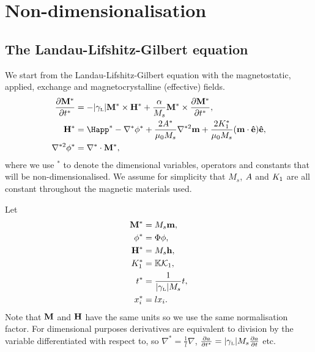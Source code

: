 \section{Non-dimensionalisation}
\label{sec:normalisations-appendix}



\subsection{The Landau-Lifshitz-Gilbert equation}
\label{sec:land-lifsh-gilb-normalisation}

We start from the Landau-Lifshitz-Gilbert equation with the magnetostatic, applied, exchange and magnetocrystalline (effective) fields. 
\begin{align}
  \pd{\Mv^*}{t^*} &= - \gymagc \Mv^* \times \Hv^* + \frac{\alpha}{M_s} \Mv^* \times \pd{\Mv^*}{t^*}, \label{eqn:llgnd} \\
  \Hv^* &= \Happ^* - \nabla^* \phi^* + \frac{2\Exchc^*}{\mu_0 M_s} \nabla^{*2} \mv + \frac{2\Kone^*}{\mu_0 M_s} (\mv \cdot \ev) \ev,
          \label{eqn:effnd} \\
  \nabla^{*2} \phi^* &= \nabla^* \cdot \Mv^*, \label{eqn:phind}
\end{align}
where we use $^*$ to denote the dimensional variables, operators and constants that will be non-dimensionalised. We assume for simplicity that $M_s$, $A$ and $K_1$ are all
constant throughout the magnetic materials used.

Let
\begin{equation}
  \label{eqn:nddefs}
  \begin{aligned}
    \mathbf{M}^* &= M_s \mathbf{m},  \\
    \phi^* &= \Phi \phi,  \\
    \mathbf{H}^* &= M_s \mathbf{h},  \\
    K_1^* &= \mathbb{K} \mathcal{K}_1,  \\
    t^* &= \frac{1}{{\left|{\gamma_{\text{\tiny{L}}}} \right|} M_s} t,  \\
    x_i^* &= l x_i. 
  \end{aligned}
\end{equation}
Note that $\mathbf{M}$ and $\mathbf{H}$ have the same units so we use the same normalisation factor. For dimensional purposes derivatives are equivalent to division by the variable differentiated with respect to, so $\nabla^* = \frac{1}{l} \nabla$, $\frac{\partial a}{\partial t^*} = {\left|{\gamma_{\text{\tiny{L}}}} \right|} M_s \frac{\partial a}{\partial t}$ etc.

